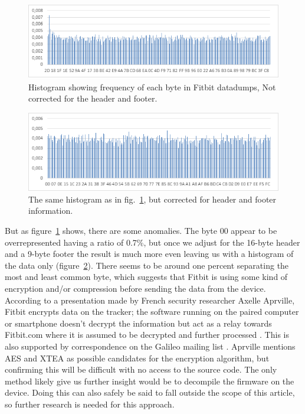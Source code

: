\documentclass[a4paper,11pt,dvips]{article}
\begin{document}
\begin{figure}
\noindent
\includegraphics[natwidth=624bp,natheight=184bp,width=\linewidth]{histogram_meta}
\caption{Histogram showing frequency of each byte in Fitbit datadumps, Not corrected for the header and footer.}
\label{fig:histogram_meta}
\end{figure}

\begin{figure}
\noindent
\includegraphics[natwidth=624bp,natheight=195bp,width=\linewidth]{histogram_nometa}
\caption{The same histogram as in fig.~\ref{fig:histogram_meta}, but corrected for header and footer information.}
\label{fig:histogram_nometa}
\end{figure}

But as figure~\ref{fig:histogram_meta} shows, there are some anomalies. The byte 00 appear to be overrepresented having a ratio of 0.7\%, but once we adjust for the 16-byte header and a 9-byte footer the result is much more even leaving us with a histogram of the data only (figure~\ref{fig:histogram_nometa}). There seems to be around one percent separating the most and least common byte, which suggests that Fitbit is using some kind of encryption and/or compression before sending the data from the device. According to a presentation made by French security researcher Axelle Aprville, Fitbit encrypts data on the tracker; the software running on the paired computer or smartphone doesn't decrypt the information but act as a relay towards Fitbit.com where it is assumed to be decrypted and further processed \citep{Aprville:2015a}. This is also supported by correspondence on the Galileo mailing list \citep{Allard:2014b}. Aprville mentions AES and XTEA as possible candidates for the encryption algorithm, but confirming this will be difficult with no access to the source code. The only method likely give us further insight would be to decompile the firmware on the device. Doing this can also safely be said to fall outside the scope of this article, so further research is needed for this approach.
\end{document}
